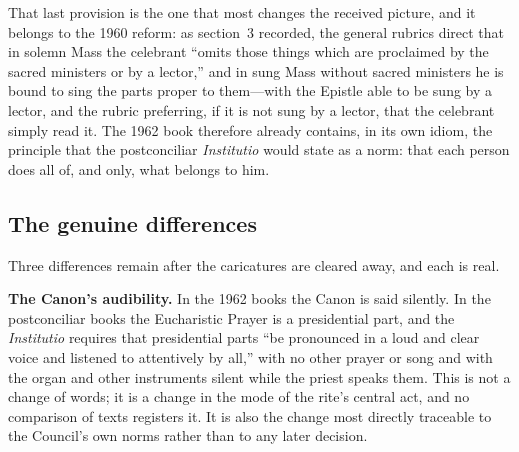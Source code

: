 That last provision is the one that most changes the received picture, and it belongs to the 1960 reform: as section~3 recorded, the general rubrics direct that in solemn Mass the celebrant ``omits those things which are proclaimed by the sacred ministers or by a lector,'' and in sung Mass without sacred ministers he is bound to sing the parts proper to them---with the Epistle able to be sung by a lector, and the rubric preferring, if it is not sung by a lector, that the celebrant simply read it. The 1962 book therefore already contains, in its own idiom, the principle that the postconciliar \emph{Institutio} would state as a norm: that each person does all of, and only, what belongs to him.

\subsection{The genuine differences}

Three differences remain after the caricatures are cleared away, and each is real.

\textbf{The Canon's audibility.} In the 1962 books the Canon is said silently. In the postconciliar books the Eucharistic Prayer is a presidential part, and the \emph{Institutio} requires that presidential parts ``be pronounced in a loud and clear voice and listened to attentively by all,'' with no other prayer or song and with the organ and other instruments silent while the priest speaks them. This is not a change of words; it is a change in the mode of the rite's central act, and no comparison of texts registers it. It is also the change most directly traceable to the Council's own norms rather than to any later decision.

